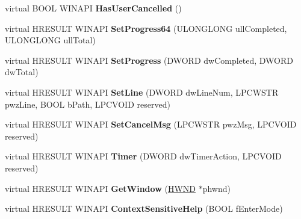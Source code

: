 \begin{DoxyCompactItemize}
virtual B\+O\+OL W\+I\+N\+A\+PI {\bfseries Has\+User\+Cancelled} ()
\item 
\mbox{\label{class_c_progress_dialog_ad3b7282bcb23ee7aecf347833b715b8c}} 
virtual H\+R\+E\+S\+U\+LT W\+I\+N\+A\+PI {\bfseries Set\+Progress64} (U\+L\+O\+N\+G\+L\+O\+NG ull\+Completed, U\+L\+O\+N\+G\+L\+O\+NG ull\+Total)
\item 
\mbox{\label{class_c_progress_dialog_ae7ef422fbaf5da3da8461b759c2a143d}} 
virtual H\+R\+E\+S\+U\+LT W\+I\+N\+A\+PI {\bfseries Set\+Progress} (D\+W\+O\+RD dw\+Completed, D\+W\+O\+RD dw\+Total)
\item 
\mbox{\label{class_c_progress_dialog_a3f99abcdd924e8d95d16fd530c499595}} 
virtual H\+R\+E\+S\+U\+LT W\+I\+N\+A\+PI {\bfseries Set\+Line} (D\+W\+O\+RD dw\+Line\+Num, L\+P\+C\+W\+S\+TR pwz\+Line, B\+O\+OL b\+Path, L\+P\+C\+V\+O\+ID reserved)
\item 
\mbox{\label{class_c_progress_dialog_a6fb67d32298ea0eebc480a6ef31dbf6d}} 
virtual H\+R\+E\+S\+U\+LT W\+I\+N\+A\+PI {\bfseries Set\+Cancel\+Msg} (L\+P\+C\+W\+S\+TR pwz\+Msg, L\+P\+C\+V\+O\+ID reserved)
\item 
\mbox{\label{class_c_progress_dialog_a41cdc4f47aec13e49f65fc6767602da1}} 
virtual H\+R\+E\+S\+U\+LT W\+I\+N\+A\+PI {\bfseries Timer} (D\+W\+O\+RD dw\+Timer\+Action, L\+P\+C\+V\+O\+ID reserved)
\item 
\mbox{\label{class_c_progress_dialog_a767dbe5a0e1f4eff1db58331b707f9c7}} 
virtual H\+R\+E\+S\+U\+LT W\+I\+N\+A\+PI {\bfseries Get\+Window} (\hyperlink{interfacevoid}{H\+W\+ND} $\ast$phwnd)
\item 
\mbox{\label{class_c_progress_dialog_a323ce43142463d601b9312188f080afc}} 
virtual H\+R\+E\+S\+U\+LT W\+I\+N\+A\+PI {\bfseries Context\+Sensitive\+Help} (B\+O\+OL f\+Enter\+Mode)
\end{DoxyCompactItemize}
